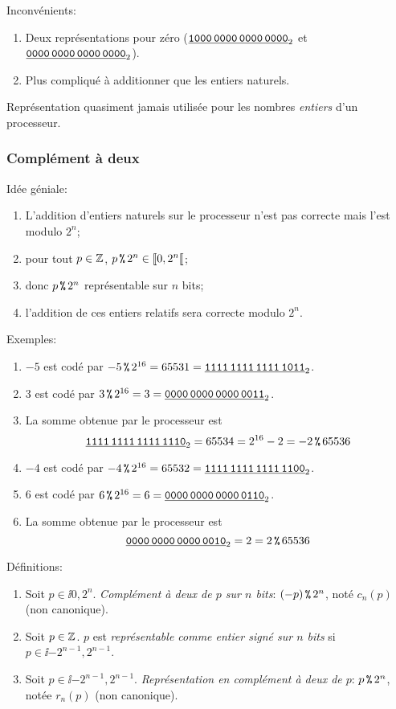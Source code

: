 Inconvénients:
\begin{enumerate}
\item Deux représentations pour zéro ($\underline{\text{\texttt{1000\,0000\,0000\,0000}}}_{2}$
  et $\underline{\text{\texttt{0000\,0000\,0000\,0000}}}_{2}$).
\item Plus compliqué à additionner que les entiers
  naturels.
\end{enumerate}

Représentation quasiment jamais utilisée pour les nombres
\emph{entiers} d'un processeur.
\subsubsection{Complément à deux}
Idée géniale:
\begin{enumerate}
\item L'addition d'entiers naturels sur le processeur n'est pas
  correcte mais l'est modulo $2^{n}$;
\item pour tout $p\in \mathbb{Z}$, $p\operatorname{\texttt{\%}} 2^{n} \in [\![0,2^{n}[\![$;
\item donc $p\operatorname{\texttt{\%}} 2^{n}$ représentable sur $n$ bits;
\item l'addition de ces entiers relatifs sera correcte modulo $2^{n}$.
\end{enumerate}

Exemples:
\begin{enumerate}
\item $-5$ est codé par $-5 \operatorname{\texttt{\%}} 2^{16} = 65531 =
  \underline{\text{\texttt{1111\,1111\,1111\,1011}}}_{2}$.
\item $3$ est codé par $3 \operatorname{\texttt{\%}} 2^{16} = 3 =
  \underline{\text{\texttt{0000\,0000\,0000\,0011}}}_{2}$.
\item La somme obtenue par le processeur est
  \begin{equation*}
    \underline{\text{\texttt{1111\,1111\,1111\,1110}}}_{2} = 65534 = 2^{16}-2 = -2 \operatorname{\texttt{\%}} 65536
  \end{equation*}
\item $-4$ est codé par $-4 \operatorname{\texttt{\%}} 2^{16} = 65532 =
  \underline{\text{\texttt{1111\,1111\,1111\,1100}}}_{2}$.
\item $6$ est codé par $6 \operatorname{\texttt{\%}} 2^{16} = 6 =
  \underline{\text{\texttt{0000\,0000\,0000\,0110}}}_{2}$.
\item La somme obtenue par le processeur est
  \begin{equation*}
   \underline{\text{\texttt{0000\,0000\,0000\,0010}}}_{2} = 2 = 2 \operatorname{\texttt{\%}} 65536
  \end{equation*}
\end{enumerate}

Définitions:
\begin{enumerate}
\item Soit $p\in \ii{0,2^{n}}$. \emph{Complément à deux de $p$ sur $n$
    bits}: $(-p) \operatorname{\texttt{\%}} 2^{n}$, noté $c_{n}(p)$ (non canonique).
\item Soit $p\in\mathbb{Z}$. $p$ est \emph{représentable comme
    entier signé sur $n$ bits} si $p\in\ii{-2^{n-1},2^{n-1}}$.
\item Soit $p\in\ii{-2^{n-1},2^{n-1}}$. \emph{Représentation en
    complément à deux de $p$}: $p\operatorname{\texttt{\%}} 2^{n}$, notée $r_{n}(p)$ (non
  canonique).
\end{enumerate}

